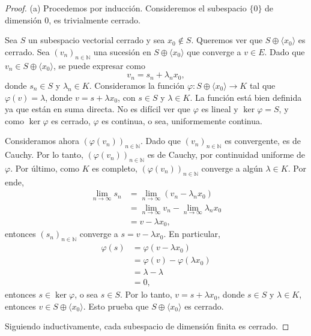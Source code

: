 \begin{proof}
    (a) Procedemos por inducción. Consideremos el subespacio $\{0\}$ de dimensión $0$, es trivialmente cerrado. 

    Sea $S$ un subespacio vectorial cerrado y sea $x_0 \not\in S$. Queremos ver que $S \oplus \langle x_0 \rangle$ es cerrado. Sea $(v_n)_{n \in \mathbb{N}}$ una sucesión en $S \oplus \langle x_0 \rangle$ que converge a $v \in E$. Dado que $v_n \in S \oplus \langle x_0 \rangle$, se puede expresar como
    \begin{equation*}
        v_n = s_n + \lambda_n x_0,
    \end{equation*}
    donde $s_n \in S$ y $\lambda_n \in K$. Consideramos la función $\varphi : S \oplus \langle x_0 \rangle \to K$ tal que $\varphi(v) = \lambda$, donde $v = s + \lambda x_0$, con $s \in S$ y $\lambda \in K$. La función está bien definida ya que están en suma directa. No es difícil ver que $\varphi$ es lineal y $\ker \varphi = S$, y como $\ker \varphi$ es cerrado, $\varphi$ es continua, o sea, uniformemente continua.

    Consideramos ahora $(\varphi(v_n))_{n \in \mathbb{N}}$. Dado que $(v_n)_{n \in \mathbb{N}}$ es convergente, es de Cauchy. Por lo tanto, $(\varphi(v_n))_{n \in \mathbb{N}}$ es de Cauchy, por continuidad uniforme de $\varphi$. Por último, como $K$ es completo, $(\varphi(v_n))_{n \in \mathbb{N}}$ converge a algún $\lambda \in K$. Por ende,
    \begin{align*}
        \lim_{n \to \infty} s_n &= \lim_{n \to \infty} (v_n - \lambda_n x_0) \\
        &= \lim_{n \to \infty} v_n - \lim_{n \to \infty} \lambda_n x_0 \\
        &= v - \lambda x_0,
    \end{align*}
    entonces $(s_n)_{n \in \mathbb{N}}$ converge a $s = v - \lambda x_0$. En particular,
    \begin{align*}
        \varphi(s) &= \varphi(v - \lambda x_0) \\
        &= \varphi(v) - \varphi(\lambda x_0) \\
        &= \lambda - \lambda \\
        &= 0,
    \end{align*}
    entonces $s \in \ker \varphi$, o sea $s \in S$. Por lo tanto, $v = s + \lambda x_0$, donde $s \in S$ y $\lambda \in K$, entonces $v \in S \oplus \langle x_0 \rangle$. Esto prueba que $S \oplus \langle x_0 \rangle$ es cerrado.

    Siguiendo inductivamente, cada subespacio de dimensión finita es cerrado.


\end{proof}
